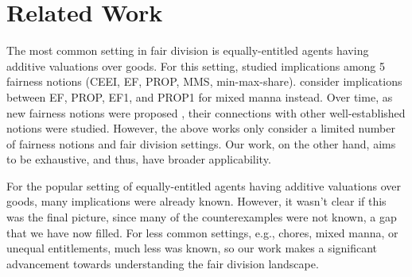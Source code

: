 \section{Related Work}
The most common setting in fair division is equally-entitled agents
having additive valuations over goods. For this setting, \cite{bouveret2016characterizing}
studied implications among 5 fairness notions (CEEI, EF, PROP, MMS, min-max-share).
\cite{aziz2021fair} consider implications between EF, PROP, EF1, and PROP1 for mixed manna instead.
Over time, as new fairness notions were proposed
\cite{caragiannis2023new,babaioff2023fair,barman2018groupwise,aziz2018knowledge},
their connections with other well-established notions were studied.
However, the above works only consider a limited number of fairness notions and fair division settings.
Our work, on the other hand, aims to be exhaustive, and thus, have broader applicability.

For the popular setting of equally-entitled agents having additive valuations over goods,
many implications were already known. However, it wasn't clear if this was the final picture,
since many of the counterexamples were not known, a gap that we have now filled.
For less common settings, e.g., chores, mixed manna, or unequal entitlements, much less was known,
so our work makes a significant advancement towards understanding the fair division landscape.